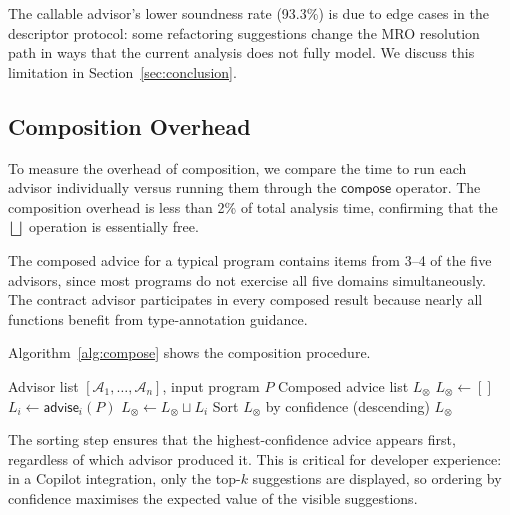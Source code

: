 \documentclass[11pt]{article}
\newcommand{\Adv}{\mathcal{A}}
\newcommand{\AdvisorOp}{\mathsf{advise}}
\newcommand{\ComposeOp}{\mathsf{compose}}
\begin{document}
The callable advisor's lower soundness rate (93.3\%) is due to edge
cases in the descriptor protocol: some refactoring suggestions change
the MRO resolution path in ways that the current analysis does not
fully model.  We discuss this limitation in Section~\ref{sec:conclusion}.

\subsection{Composition Overhead}\label{sec:composition-overhead}

To measure the overhead of composition, we compare the time to run
each advisor individually versus running them through the
$\ComposeOp$ operator.  The composition overhead is less than 2\%
of total analysis time, confirming that the $\bigsqcup$ operation
is essentially free.

The composed advice for a typical program contains items from 3--4
of the five advisors, since most programs do not exercise all five
domains simultaneously.  The contract advisor participates in
every composed result because nearly all functions benefit from
type-annotation guidance.

Algorithm~\ref{alg:compose} shows the composition procedure.

\begin{algorithm}[ht]
\caption{Advisor Composition}\label{alg:compose}
\begin{algorithmic}[1]
\REQUIRE Advisor list $[\Adv_1, \ldots, \Adv_n]$, input program $P$
\ENSURE Composed advice list $L_{\otimes}$
\STATE $L_{\otimes} \leftarrow []$
  \IF{$\Adv_i.\mathsf{enabled}$}
    \STATE $L_i \leftarrow \AdvisorOp_i(P)$
    \STATE $L_{\otimes} \leftarrow L_{\otimes} \sqcup L_i$
  \ENDIF
\ENDFOR
\STATE Sort $L_{\otimes}$ by confidence (descending)
\RETURN $L_{\otimes}$
\end{algorithmic}
\end{algorithm}

The sorting step ensures that the highest-confidence advice appears
first, regardless of which advisor produced it.  This is critical
for developer experience: in a Copilot integration, only the top-$k$
suggestions are displayed, so ordering by confidence maximises the
expected value of the visible suggestions.

\end{document}
